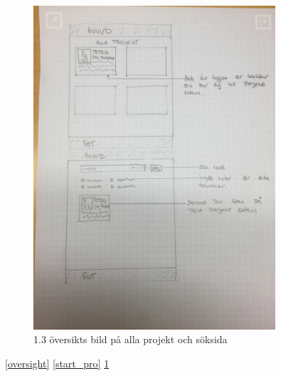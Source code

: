 \documentclass{TDP003mall}
\begin{document}
\begin{figure}[ht!]
\centering
\includegraphics[width=90mm]{IMG_0066.jpg}
\caption{1.3 översikts bild på alla projekt och söksida} \label{search_all}
\end{figure}



\ref{oversight}
\ref{start_pro}
\ref{search_all}
\end{document}
